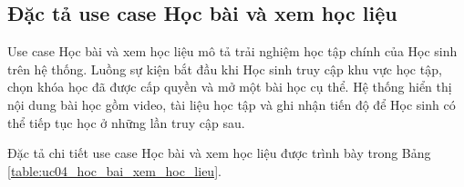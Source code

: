 ﻿\documentclass[../DoAn.tex]{subfiles}
\begin{document}
\subsection{Đặc tả use case Học bài và xem học liệu}
\label{subsection:2.3.4}

Use case Học bài và xem học liệu mô tả trải nghiệm học tập chính của Học sinh trên hệ thống. Luồng sự kiện bắt đầu khi Học sinh truy cập khu vực học tập, chọn khóa học đã được cấp quyền và mở một bài học cụ thể. Hệ thống hiển thị nội dung bài học gồm video, tài liệu học tập và ghi nhận tiến độ để Học sinh có thể tiếp tục học ở những lần truy cập sau.

Đặc tả chi tiết use case Học bài và xem học liệu được trình bày trong Bảng \ref{table:uc04_hoc_bai_xem_hoc_lieu}.

\begingroup
\small
\renewcommand{\arraystretch}{1.15}
\setlength{\LTpre}{0pt}
\setlength{\LTpost}{0pt}
\end{document}
